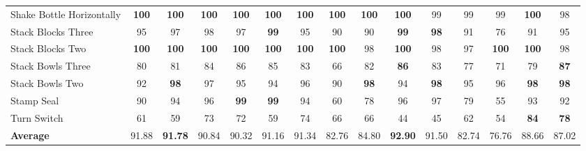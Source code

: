 \documentclass{article}
\begin{document}
\begin{table}[t]
{\begin{tabular}{lcc|cc|cc|cc|cc|cc|cc}
Shake Bottle Horizontally & \textbf{100} & \textbf{100} & \textbf{100} & \textbf{100} & \textbf{100} & \textbf{100} & \textbf{100} & \textbf{100} & \textbf{100} & 99 & 99 & 99 & \textbf{100} & 98 \\
Stack Blocks Three & 95 & 97 & 98 & 97 & \textbf{99} & 95 & 90 & 90 & \textbf{99} & \textbf{98} & 91 & 76 & 91 & 95 \\
Stack Blocks Two & \textbf{100} & \textbf{100} & \textbf{100} & \textbf{100} & \textbf{100} & \textbf{100} & \textbf{100} & 98 & \textbf{100} & 98 & 97 & \textbf{100} & \textbf{100} & 98 \\
Stack Bowls Three & 80 & 81 & 84 & 86 & 85 & 83 & 66 & 82 & \textbf{86} & 83 & 77 & 71 & 79 & \textbf{87} \\
Stack Bowls Two & 92 & \textbf{98} & 97 & 95 & 94 & 96 & 90 & \textbf{98} & 94 & \textbf{98} & 95 & 96 & \textbf{98} & \textbf{98} \\
Stamp Seal & 90 & 94 & 96 & \textbf{99} & \textbf{99} & 94 & 60 & 78 & 96 & 97 & 79 & 55 & 93 & 92 \\
Turn Switch & 61 & 59 & 73 & 72 & 59 & 74 & 66 & 66 & 44 & 45 & 62 & 54 & \textbf{84} & \textbf{78} \\
\midrule
\textbf{Average} & 91.88 & \textbf{91.78} & 90.84 & 90.32 & 91.16 & 91.34 & 82.76 & 84.80 & \textbf{92.90} & 91.50 & 82.74 & 76.76 & 88.66 & 87.02 \\
\bottomrule
\end{tabular}
}
\end{table}

\end{document}
